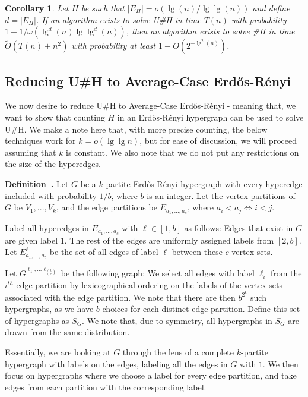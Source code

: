 \documentclass[11pt,letterpaper,pdftex]{article}
\newtheorem{corollary}[theorem]{Corollary}
\newcounter{definition}
\newenvironment{definition}[1][]{\refstepcounter{definition}\par\medskip
   \noindent \textbf{Definition~\thedefinition. #1} \rmfamily}{\medskip}
\def\edgepartitionc{E_{a_1,...,a_c}}
\def\gchosenlabels{G^{\ell_1,...\ell_{\binom{k}{c}}}}
\def\Otil{\tilde{O}}
\begin{document}
\begin{corollary}\label{H TO UH}
Let $ H $ be such that $|E_H|=o(\lg(n)/\lg\lg(n) )$ and define $d = |E_H|$. If an algorithm exists to solve U\#H in time $T(n)$ with probability $1-1/\omega(\lg^d(n)\lg\lg^d(n) )$, then an algorithm exists to solve \#H in time $\Otil(T(n) + n^2)$ with probability at least $1-O \left(2^ {-\lg^2(n)}\right)$.
\end{corollary}

\subsection{Reducing U\#H to Average-Case Erd{\H{o}}s-R{\'{e}}nyi}

We now desire to reduce U\#H to Average-Case Erd{\H{o}}s-R{\'{e}}nyi - meaning that, we want to show that counting $H$ in an Erd{\H{o}}s-R{\'{e}}nyi hypergraph can be used to solve U\#H. We make a note here that, with more precise counting, the below techniques work for $k = o(\lg\lg n)$, but for ease of discussion, we will proceed assuming that $k$ is constant. We also note that we do not put any restrictions on the size of the hyperedges. 

\begin{definition}
Let $G$ be a $k$-partite Erd{\H{o}}s-R{\'{e}}nyi hypergraph with every hyperedge included with probability $1/b$, where $b$ is an integer. Let the vertex partitions of $G$ be $V_1,...,V_k$, and the edge partitions be $\edgepartitionc$, where $a_i < a_j \iff i < j$.

Label all hyperedges in $\edgepartitionc$ with $\ell\in[1,b]$ as follows: Edges that exist in $G$ are given label 1. The rest of the edges are uniformly assigned labels from $[2,b]$. Let $\edgepartitionc^\ell$ be the set of all edges of label $\ell$ between these $c$ vertex sets.

Let $\gchosenlabels$ be the following graph: We select all edges with label $\ell_i$ from the $i^{th}$ edge partition by lexicographical ordering on the labels of the vertex sets associated with the edge partition. We note that there are then $b^{2^k}$ such hypergraphs, as we have $b$ choices for each distinct edge partition. Define this set of hypergraphs as $S_G$. We note that, due to symmetry, all hypergraphs in $S_G$ are drawn from the same distribution.
\end{definition}

Essentially, we are looking at $G$ through the lens of a complete $k$-partite hypergraph with labels on the edges, labeling all the edges in $G$ with $1$. We then focus on hypergraphs where we choose a label for every edge partition, and take edges from each partition with the corresponding label.
\end{document}
